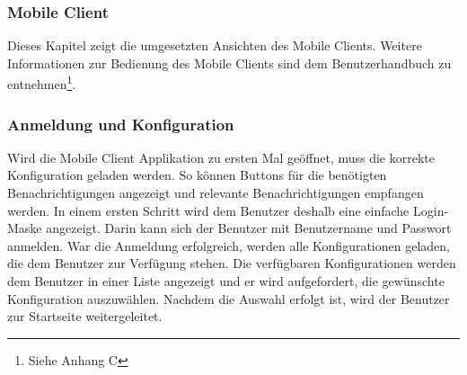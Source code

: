 \subsubsection{Mobile Client}\label{subsec:mobile-client-realisation}

Dieses Kapitel zeigt die umgesetzten Ansichten des Mobile Clients.
Weitere Informationen zur Bedienung des Mobile Clients sind dem Benutzerhandbuch zu entnehmen\footnote{Siehe Anhang C}.

\subsubsection*{Anmeldung und Konfiguration}

Wird die Mobile Client Applikation zu ersten Mal geöffnet, muss die korrekte Konfiguration geladen werden.
So können Buttons für die benötigten Benachrichtigungen angezeigt und relevante Benachrichtigungen empfangen werden.
In einem ersten Schritt wird dem Benutzer deshalb eine einfache Login-Maske angezeigt.
Darin kann sich der Benutzer mit Benutzername und Passwort anmelden.
War die Anmeldung erfolgreich, werden alle Konfigurationen geladen, die dem Benutzer zur Verfügung stehen.
Die verfügbaren Konfigurationen werden dem Benutzer in einer Liste angezeigt und er wird aufgefordert, die gewünschte Konfiguration auszuwählen.
Nachdem die Auswahl erfolgt ist, wird der Benutzer zur Startseite weitergeleitet.


